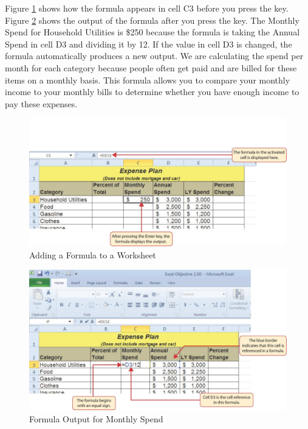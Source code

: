Figure \ref{02:fig03} shows how the formula appears in cell \textsf{C3} before you press the  key. Figure \ref{02:fig04} shows the output of the formula after you press the  key. The Monthly Spend for Household Utilities is \$250 because the formula is taking the Annual Spend in cell \textsf{D3} and dividing it by 12. If the value in cell \textsf{D3} is changed, the formula automatically produces a new output. We are calculating the spend per month for each category because people often get paid and are billed for these items on a monthly basis. This formula allows you to compare your monthly income to your monthly bills to determine whether you have enough income to pay these expenses.

\begin{figure}[H]
	\centering
	\includegraphics[width=\maxwidth{.95\linewidth}]{gfx/ch02_fig03}
	\caption{Adding a Formula to a Worksheet}
	\label{02:fig03}
\end{figure}

\begin{figure}[H]
	\centering
	\includegraphics[width=\maxwidth{.95\linewidth}]{gfx/ch02_fig04}
	\caption{Formula Output for Monthly Spend}
	\label{02:fig04}
\end{figure}

